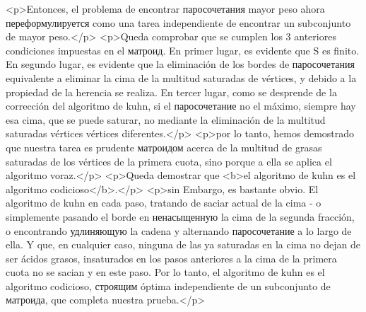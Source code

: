 <p>Entonces, el problema de encontrar паросочетания mayor peso ahora переформулируется como una tarea independiente de encontrar un subconjunto de mayor peso.</p>
<p>Queda comprobar que se cumplen los 3 anteriores condiciones impuestas en el матроид. En primer lugar, es evidente que S es finito. En segundo lugar, es evidente que la eliminación de los bordes de паросочетания equivalente a eliminar la cima de la multitud saturadas de vértices, y debido a la propiedad de la herencia se realiza. En tercer lugar, como se desprende de la corrección del algoritmo de kuhn, si el паросочетание no el máximo, siempre hay esa cima, que se puede saturar, no mediante la eliminación de la multitud saturadas vértices vértices diferentes.</p>
<p>por lo tanto, hemos demostrado que nuestra tarea es prudente матроидом acerca de la multitud de grasas saturadas de los vértices de la primera cuota, sino porque a ella se aplica el algoritmo voraz.</p>
<p>Queda demostrar que <b>el algoritmo de kuhn es el algoritmo codicioso</b>.</p>
<p>sin Embargo, es bastante obvio. El algoritmo de kuhn en cada paso, tratando de saciar actual de la cima - o simplemente pasando el borde en ненасыщенную la cima de la segunda fracción, o encontrando удлиняющую la cadena y alternando паросочетание a lo largo de ella. Y que, en cualquier caso, ninguna de las ya saturadas en la cima no dejan de ser ácidos grasos, insaturados en los pasos anteriores a la cima de la primera cuota no se sacian y en este paso. Por lo tanto, el algoritmo de kuhn es el algoritmo codicioso, строящим óptima independiente de un subconjunto de матроида, que completa nuestra prueba.</p>